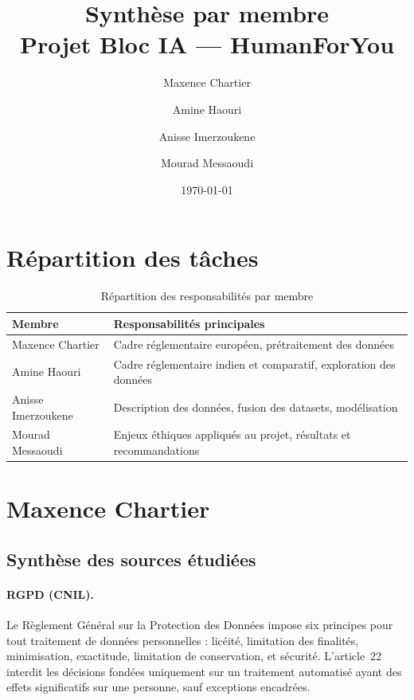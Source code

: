 \documentclass[12pt,a4paper]{article}
\title{Synthèse par membre \\ \Large Projet Bloc IA --- HumanForYou}
\author{
    Maxence Chartier \and
    Amine Haouri \and
    Anisse Imerzoukene \and
    Mourad Messaoudi
}
\date{\today}
\begin{document}
\maketitle
\tableofcontents
\newpage

\section{Répartition des tâches}

\begin{table}[h!]
\centering
\caption{Répartition des responsabilités par membre}
\small
\begin{tabularx}{\textwidth}{l X}
\toprule
\textbf{Membre} & \textbf{Responsabilités principales} \\
\midrule
Maxence Chartier & Cadre réglementaire européen, prétraitement des données \\
Amine Haouri & Cadre réglementaire indien et comparatif, exploration des données \\
Anisse Imerzoukene & Description des données, fusion des datasets, modélisation \\
Mourad Messaoudi & Enjeux éthiques appliqués au projet, résultats et recommandations \\
\bottomrule
\end{tabularx}
\end{table}

\section{Maxence Chartier}

\subsection{Synthèse des sources étudiées}

\paragraph{RGPD (CNIL).}
Le Règlement Général sur la Protection des Données impose six principes pour tout traitement de données personnelles : licéité, limitation des finalités, minimisation, exactitude, limitation de conservation, et sécurité. L'article~22 interdit les décisions fondées uniquement sur un traitement automatisé ayant des effets significatifs sur une personne, sauf exceptions encadrées.
\end{document}
